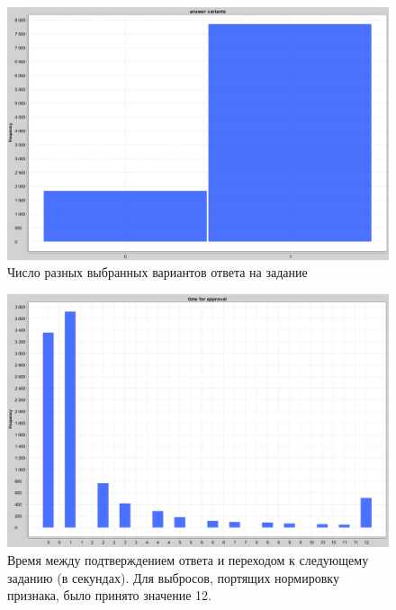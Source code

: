 \documentclass[specification,annotation,times]{itmo-student-thesis}
\begin{document}
\begin{figure}
  \includegraphics[scale=0.5]{answer_variants.PNG}
  \caption{Число разных выбранных вариантов ответа на задание}
  \label{fig:answer_variants}
\end{figure}

\begin{figure}
  \includegraphics[scale=0.5]{time_for_approval.PNG}
  \caption{Время между подтверждением ответа и переходом к следующему заданию (в секундах). Для выбросов, портящих нормировку признака, было принято значение 12.}
  \label{fig:approval_time}
\end{figure}
\end{document}
